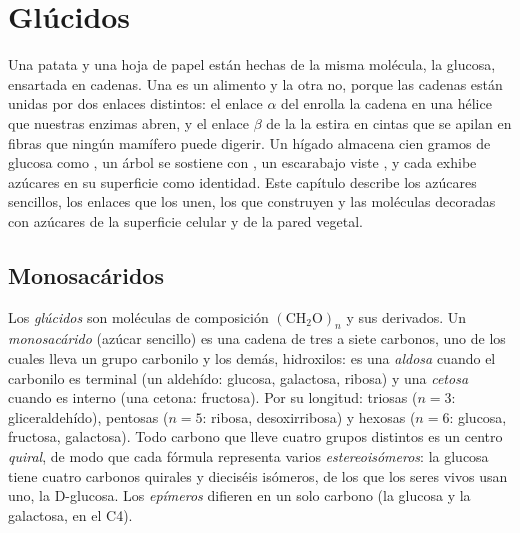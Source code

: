\chapter{Glúcidos}\label{ch:b1:carbohydrates}

Una patata y una hoja de papel están hechas de la misma molécula, la
glucosa, ensartada en cadenas. Una es un alimento y la otra no, porque las
cadenas están unidas por dos enlaces distintos: el enlace $\alpha$ del
 enrolla la cadena en una hélice que nuestras enzimas abren, y el
enlace $\beta$ de la  la estira en cintas que se apilan en fibras
que ningún mamífero puede digerir. Un hígado almacena cien gramos de glucosa
como , un árbol se sostiene con , un escarabajo viste
, y cada  exhibe azúcares en su superficie como identidad. Este
capítulo describe los azúcares sencillos, los enlaces que los unen, los
 que construyen y las moléculas decoradas con azúcares de la
superficie celular y de la pared vegetal.

\section{Monosacáridos}

\begin{definition}[Monosacárido]\label{def:b1:carbohydrates:monosaccharide}
Los \emph{glúcidos} son moléculas de composición
$(\mathrm{CH_2O})_n$ y sus derivados. Un
\emph{monosacárido} (azúcar sencillo) es una cadena de
tres a siete carbonos, uno de los cuales lleva un grupo carbonilo y los
demás, hidroxilos: es una \emph{aldosa} cuando el carbonilo es
terminal (un aldehído: glucosa, galactosa, ribosa) y una
\emph{cetosa} cuando es interno (una cetona: fructosa). Por su
longitud: triosas ($n = 3$: gliceraldehído), pentosas ($n = 5$: ribosa,
desoxirribosa) y hexosas ($n = 6$: glucosa, fructosa, galactosa). Todo
carbono que lleve cuatro grupos distintos es un centro \emph{quiral}, de
modo que cada fórmula representa varios \emph{estereoisómeros}: la glucosa
tiene cuatro carbonos quirales y dieciséis isómeros, de los que los seres
vivos usan uno, la D-glucosa. Los \emph{epímeros} difieren en un solo
carbono (la glucosa y la galactosa, en el C4).
\end{definition}

